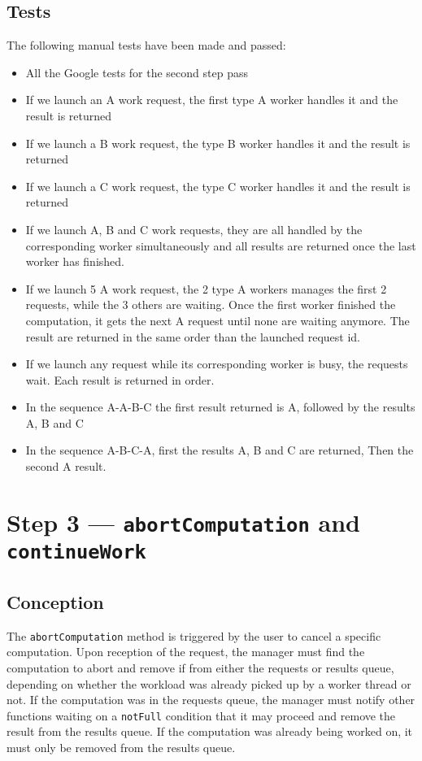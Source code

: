 \documentclass{article}
\begin{document}
    \subsection*{Tests}

    The following manual tests have been made and passed:
    \begin{itemize}
        \item All the Google tests for the second step pass
        \item If we launch an A work request, the first type A worker handles it and the result is returned
        \item If we launch a B work request, the type B worker handles it and the result is returned
        \item If we launch a C work request, the type C worker handles it and the result is returned
        \item If we launch A, B and C work requests, they are all handled by the corresponding worker simultaneously and all results are returned once the last worker has finished.
        \item If we launch 5 A work request, the 2 type A workers manages the first 2 requests, while the 3 others are waiting. Once the first worker finished the computation, it gets the next A request until none are waiting anymore. The result are returned in the same order than the launched request id.
        \item If we launch any request while its corresponding worker is busy, the requests wait. Each result is returned in order.
        \item In the sequence A-A-B-C the first result returned is A, followed by the results A, B and C
        \item In the sequence A-B-C-A, first the results A, B and C are returned, Then the second A result.
    \end{itemize}

    \pagebreak

    \section*{Step 3 --- \texttt{abortComputation} and \texttt{continueWork}}

    \subsection*{Conception}

    The \texttt{abortComputation} method is triggered by the user to cancel a specific computation.
    Upon reception of the request, the manager must find the computation to abort and remove if from either the requests or results queue, depending
    on whether the workload was already picked up by a worker thread or not.
    If the computation was in the requests queue, the manager must notify other functions waiting on a \texttt{notFull} condition that it may proceed and remove the result from the results queue.
    If the computation was already being worked on, it must only be removed from the results queue.
\end{document}
